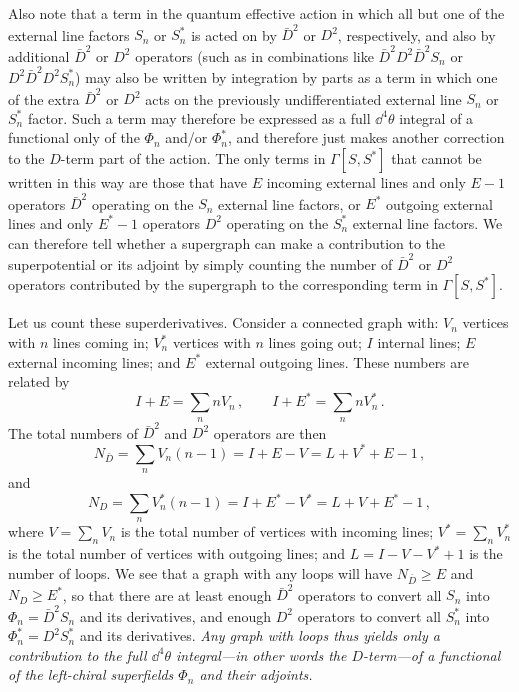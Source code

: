 Also note that a term in the quantum effective action in which all but one of
the external line factors \(S_n\) or \(S_n^*\) is acted on by
\(\bar D^2\) or \(D^2\), respectively, and also by additional
\(\bar D^2\) or \(D^2\) operators (such as in combinations like
\(\bar D^2D^2\bar D^2S_n\) or
\(D^2\bar D^2D^2S_n^*\)) may also be written by
integration by parts as a term in which one of the extra \(\bar D^2\) or
\(D^2\) acts on the previously undifferentiated external line
\(S_n\) or \(S_n^*\) factor. Such a term may therefore be expressed
as a full \(\dd^4\theta\) integral of a functional only of the \(\Phi_n\)
and/or \(\Phi_n^*\), and therefore just makes another correction to the
\(D\)-term part of the action. The only terms in
\(\Gamma[S,S^*]\) that
cannot be written in this way are those that have \(E\) incoming external
lines and only \(E-1\) operators \(\bar D^2\) operating on the \(S_n\)
external line factors, or \(E^*\) outgoing external lines and only
\(E^*-1\) operators \(D^2\) operating on the \(S_n^*\) external
line factors.
We can therefore tell whether a supergraph can make a contribution to the
superpotential or its adjoint by simply counting the number of
\(\bar D^2\) or \(D^2\) operators contributed by the supergraph
to the corresponding term in \(\Gamma[S,S^*]\).

Let us count these superderivatives. Consider a connected graph with:
\(V_n\) vertices with \(n\) lines coming in; \(V_n^*\) vertices with \(n\)
lines going out; \(I\) internal lines; \(E\) external incoming lines; and
\(E^*\) external outgoing lines. These numbers are related by
\begin{equation}
  I+E=\sum_n nV_n\,,
  \qquad
  I+E^*=\sum_n nV_n^*\,.
  \tag{30.3.2}\label{eq:30.3.2}
\end{equation}
The total numbers of \(\bar D^2\) and \(D^2\) operators are then
\begin{equation}
  N_{\bar D}
  =\sum_nV_n(n-1)
  =I+E-V
  =L+V^*+E-1\,,
  \tag{30.3.3}\label{eq:30.3.3}
\end{equation}
and
\begin{equation}
  N_D
  =\sum_nV_n^*(n-1)
  =I+E^*-V^*
  =L+V+E^*-1\,,
  \tag{30.3.4}\label{eq:30.3.4}
\end{equation}
where \(V=\sum_nV_n\) is the total number of vertices with incoming lines;
\(V^*=\sum_nV_n^*\) is the total number of vertices with outgoing lines; and
\(L=I-V-V^*+1\) is the number of loops. We see that a graph with any loops
will have \(N_{\bar D}\geq E\) and \(N_D\geq E^*\), so that there are at
least enough \(\bar D^2\) operators to convert all \(S_n\) into
\(\Phi_n=\bar D^2S_n\) and its derivatives, and enough
\(D^2\) operators to convert all \(S_n^*\) into
\(\Phi_n^*=D^2S_n^*\) and its derivatives.
\emph{Any graph with loops thus yields only a contribution to the
full \(\dd^4\theta\) integral---in other words the \(D\)-term---of a
functional of the left-chiral superfields \(\Phi_n\) and their adjoints.}


